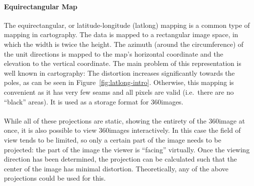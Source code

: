 \paragraph{Equirectangular Map}
The equirectangular, or latitude-longitude (latlong) mapping is a common type of mapping in cartography. The data is mapped to a rectangular image space, in which the width is twice the height. The azimuth (around the circumference) of the unit directions is mapped to the map's horizontal coordinate and the elevation to the vertical coordinate. The main problem of this representation is well known in cartography: The distortion increases significantly towards the poles, as can be seen in Figure~\ref{fig:latlong-intro}. Otherwise, this mapping is convenient as it has very few seams and all pixels are valid (i.e.\ there are no ``black'' areas). It is used as a storage format for 360\degree images.
\cite[p. 538]{hdrbook}

\paragraph*{}
While all of these projections are static, showing the entirety of the 360\degree image at once, it is also possible to view 360\degree images interactively. In this case the field of view tends to be limited, so only a certain part of the image needs to be projected: the part of the image the viewer is ``facing'' virtually. Once the viewing direction has been determined, the projection can be calculated such that the center of the image has minimal distortion. Theoretically, any of the above projections could be used for this. 

